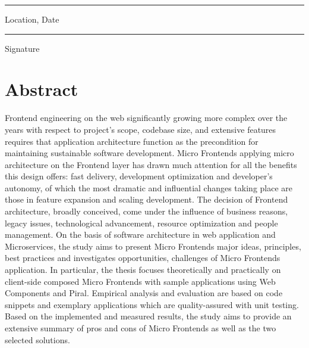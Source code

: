 \documentclass[a4paper]{book}
\begin{document}
\vspace{2cm}

\begin{minipage}[t]{7cm}
\rule{5cm}{0.1mm}
\flushleft
Location, Date
\end{minipage}
\null\hfill
\begin{minipage}[t]{7cm}
\rule{7cm}{0.1mm}
\flushleft
Signature
\end{minipage}





\clearpage
\section*{Abstract}
Frontend engineering on the web significantly growing more complex over the years with respect to project's scope, codebase size, and extensive features requires that application architecture function as the precondition for maintaining sustainable software development. Micro Frontends applying micro architecture on the Frontend layer has drawn much attention for all the benefits this design offers: fast delivery, development optimization and developer's autonomy, of which the most dramatic and influential changes taking place are those in feature expansion and scaling development. The decision of Frontend architecture, broadly conceived, come under the influence of business reasons, legacy issues, technological advancement, resource optimization and people management. On the basis of software architecture in web application and Microservices, the study aims to present Micro Frontends major ideas, principles, best practices and investigates opportunities, challenges of Micro Frontends application. In particular, the thesis focuses theoretically and practically on client-side composed Micro Frontends with sample applications using Web Components and Piral. Empirical analysis and evaluation are based on code snippets and exemplary applications which are quality-assured with unit testing. Based on the implemented and measured results, the study aims to provide an extensive summary of pros and cons of Micro Frontends as well as the two selected solutions. 
\end{document}
